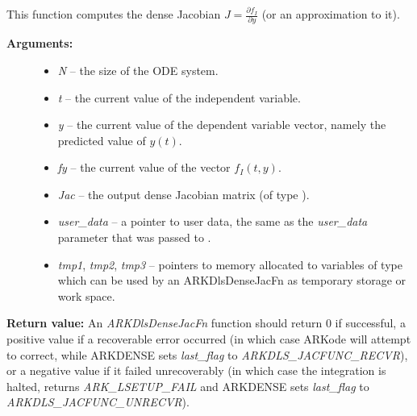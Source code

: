 \documentclass[letterpaper,10pt,english]{sphinxmanual}
\begin{document}
\begin{fulllineitems}
\label{c_interface/User_supplied:c.ARKDlsDenseJacFn}
This function computes the dense Jacobian \(J =
\frac{\partial f_I}{\partial y}\) (or an approximation to it).
\begin{description}
\item[{\textbf{Arguments:}}] \leavevmode\begin{itemize}
\item {} 
\emph{N} -- the size of the ODE system.

\item {} 
\emph{t} -- the current value of the independent variable.

\item {} 
\emph{y} -- the current value of the dependent variable vector, namely
the predicted value of \(y(t)\).

\item {} 
\emph{fy} -- the current value of the vector \(f_I(t,y)\).

\item {} 
\emph{Jac} -- the output dense Jacobian matrix (of type ).

\item {} 
\emph{user\_data} -- a pointer to user data, the same as the
\emph{user\_data} parameter that was passed to {\hyperref[c_interface/User_callable:c.ARKodeSetUserData]{\emph{}}}.

\item {} 
\emph{tmp1}, \emph{tmp2}, \emph{tmp3} -- pointers to memory allocated to
variables of type  which can be used by an
ARKDlsDenseJacFn as temporary storage or work space.

\end{itemize}

\end{description}

\textbf{Return value:}
An \emph{ARKDlsDenseJacFn} function should return 0 if
successful, a positive value if a recoverable error occurred (in
which case ARKode will attempt to correct, while ARKDENSE
sets \emph{last\_flag} to \emph{ARKDLS\_JACFUNC\_RECVR}), or a negative
value if it failed unrecoverably (in which case the integration is
halted, {\hyperref[c_interface/User_callable:c.ARKode]{\emph{}}} returns \emph{ARK\_LSETUP\_FAIL} and
ARKDENSE sets \emph{last\_flag} to \emph{ARKDLS\_JACFUNC\_UNRECVR}).


\end{fulllineitems}
\end{document}
